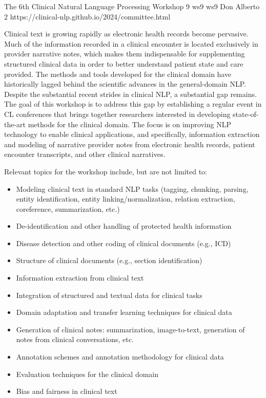 \begin{wsschedulenolist}
{The 6th Clinical Natural Language Processing Workshop}
{9}
{ws9}
{ws9}
{Don Alberto 2}
{https://clinical-nlp.github.io/2024/committee.html}

Clinical text is growing rapidly as electronic health records become pervasive. Much of the information recorded in a clinical encounter is located exclusively in provider narrative notes, which makes them indispensable for supplementing structured clinical data in order to better understand patient state and care provided. The methods and tools developed for the clinical domain have historically lagged behind the scientific advances in the general-domain NLP. Despite the substantial recent strides in clinical NLP, a substantial gap remains. The goal of this workshop is to address this gap by establishing a regular event in CL conferences that brings together researchers interested in developing state-of-the-art methods for the clinical domain. The focus is on improving NLP technology to enable clinical applications, and specifically, information extraction and modeling of narrative provider notes from electronic health records, patient encounter transcripts, and other clinical narratives.

Relevant topics for the workshop include, but are not limited to:

\begin{itemize}
    \setlength{\itemsep}{-0.3ex}
\item Modeling clinical text in standard NLP tasks (tagging, chunking, parsing, entity identification, entity linking/normalization, relation extraction, coreference, summarization, etc.)
\item De-identification and other handling of protected health information
\item Disease detection and other coding of clinical documents (e.g., ICD)
\item Structure of clinical documents (e.g., section identification)
\item Information extraction from clinical text
\item Integration of structured and textual data for clinical tasks
\item Domain adaptation and transfer learning techniques for clinical data
\item Generation of clinical notes: summarization, image-to-text, generation of notes from clinical conversations, etc.
\item Annotation schemes and annotation methodology for clinical data
\item Evaluation techniques for the clinical domain
\item Bias and fairness in clinical text
\end{itemize}


\end{wsschedulenolist}
